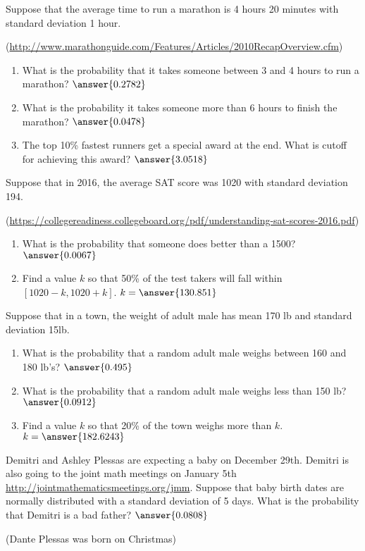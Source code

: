 \documentclass{ximera}
\begin{document}
\begin{problem}
Suppose that the average time to run a marathon is 4 hours 20 minutes with standard deviation 1 hour. 

 (\url{http://www.marathonguide.com/Features/Articles/2010RecapOverview.cfm})

\begin{enumerate}
\item What is the probability that it takes someone between 3 and 4 hours to run a marathon? $\answer{0.2782}$
\item What is the probability it takes someone more than 6 hours to finish the marathon? $\answer{0.0478}$
\item The top 10\% fastest runners get a special award at the end.  What is cutoff for achieving this award? $\answer{3.0518}$
\end{enumerate}


\end{problem}



\begin{problem}
Suppose that in 2016, the average SAT score was 1020 with standard deviation 194.

 (\url{https://collegereadiness.collegeboard.org/pdf/understanding-sat-scores-2016.pdf})

 \begin{enumerate}
\item What is the probability that someone does better than a 1500?  $\answer{0.0067}$
\item Find a value $k$ so that 50\% of the test takers will fall within $[1020-k, 1020+k]$.  $k=\answer{130.851}$
\end{enumerate}

 
\end{problem}



\begin{problem}
Suppose that in a town, the weight of adult male has mean 170 lb and standard deviation 15lb.

\begin{enumerate}
\item What is the probability that a random adult male weighs between 160 and 180 lb's? $\answer{0.495}$
\item What is the probability that a random adult male weighs less than 150 lb?  $\answer{0.0912}$
\item Find a value $k$ so that 20\% of the town weighs more than $k$.  $k=\answer{182.6243}$
\end{enumerate}


\end{problem}


\begin{problem}
Demitri and Ashley Plessas are expecting a baby on December 29th.  Demitri is also going to the joint math meetings on January 5th \url{http://jointmathematicsmeetings.org/jmm}.  Suppose that baby birth dates are normally distributed with a standard deviation of 5 days.  What is the probability that Demitri is a bad father?  $\answer{0.0808}$

(Dante Plessas was born on Christmas)


\end{problem}
\end{document}
